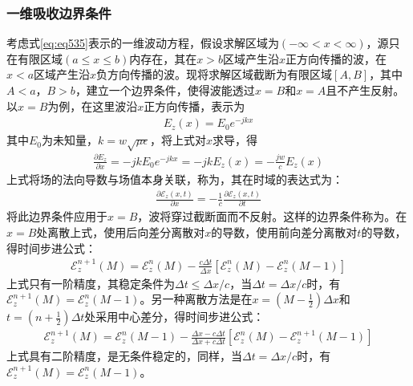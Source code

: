 \documentclass{article}
\numberwithin{equation}{section}
\begin{document}
\subsubsection{一维吸收边界条件}
考虑式\ref{eq:eq535}表示的一维波动方程，假设求解区域为$(-\infty<x<\infty)$，源只在有限区域$(a\leq x\leq b)$内存在，其在$x>b$区域产生沿$x$正方向传播的波，在$x<a$区域产生沿$x$负方向传播的波。现将求解区域截断为有限区域$[A,B]$，其中$A<a$，$B>b$，建立一个边界条件，使得波能透过$x=B$和$x=A$且不产生反射。
以$x=B$为例，在这里波沿$x$正方向传播，表示为
\begin{align}
    \label{eq:eq586}
    E_z(x)=E_0e^{-jkx}
\end{align}
其中$E_0$为未知量，$k=w\sqrt{\mu\epsilon}$，将上式对$x$求导，得
\begin{align}
    \label{eq:eq587}
    \frac{\partial E_z}{\partial x}=-jkE_0e^{-jkx}=-jkE_z(x)=-\frac{jw}{c}E_z(x)
\end{align}
上式将场的法向导数与场值本身关联，称为\textbf{\color{blue}{第三类边界条件}}，其在时域的表达式为：
\begin{align}
    \label{eq:eq588}
    \frac{\partial \mathcal{E}_z(x,t)}{\partial x}=-\frac{1}{c}\frac{\partial \mathcal{E}_z(x,t)}{\partial t}
\end{align}
将此边界条件应用于$x=B$，波将穿过截断面而不反射。这样的边界条件称为\textbf{\color{blue}{吸收边界条件(ABC)}}。在$x=B$处离散上式，使用后向差分离散对$x$的导数，使用前向差分离散对$t$的导数，得时间步进公式：
\begin{align}
    \label{eq:eq589}
    \mathcal{E}_z^{n+1}(M)=\mathcal{E}_z^{n}(M)-\frac{c\Delta t}{\Delta x}[\mathcal{E}_z^{n}(M)-\mathcal{E}_z^{n}(M-1)]
\end{align}
上式只有一阶精度，其稳定条件为$\Delta t\leq\Delta x/c$，当$\Delta t=\Delta x/c$时，有$\mathcal{E}_z^{n+1}(M)=\mathcal{E}_z^{n}(M-1)$。另一种离散方法是在$x=\left(M-\frac{1}{2}\right)\Delta x$和$t=\left(n+\frac{1}{2}\right)\Delta t$处采用中心差分，得时间步进公式：
\begin{align}
    \label{eq:eq599}
    \mathcal{E}_z^{n+1}(M)=\mathcal{E}_z^{n}(M-1)-\frac{\Delta x-c\Delta t}{\Delta x+c\Delta t}[\mathcal{E}_z^{n}(M)-\mathcal{E}_z^{n+1}(M-1)]
\end{align}
上式具有二阶精度，是无条件稳定的，同样，当$\Delta t=\Delta x/c$时，有$\mathcal{E}_z^{n+1}(M)=\mathcal{E}_z^{n}(M-1)$。
\end{document}
